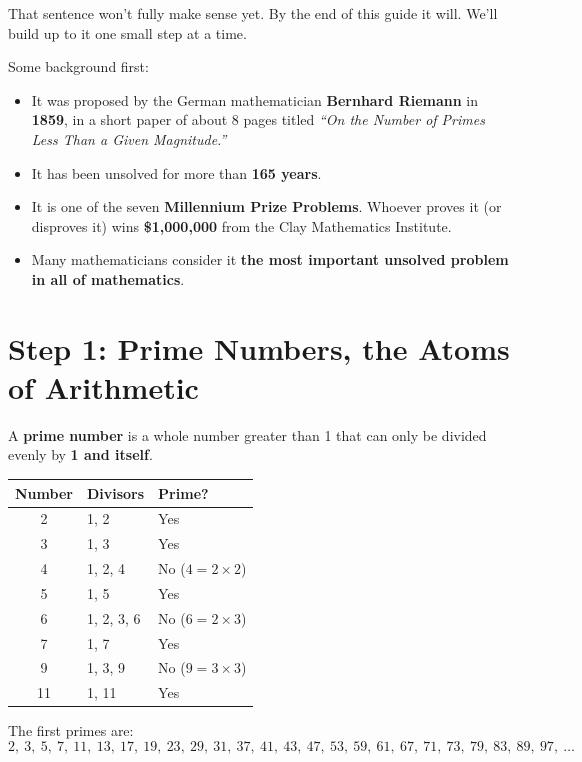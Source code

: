\documentclass[11pt,a4paper]{article}
\begin{document}
That sentence won't fully make sense yet. By the end of this guide it will. We'll build up to it one small step at a time.

Some background first:
\begin{itemize}[itemsep=2pt]
  \item It was proposed by the German mathematician \textbf{Bernhard Riemann} in \textbf{1859}, in a short paper of about 8 pages titled \emph{``On the Number of Primes Less Than a Given Magnitude.''}
  \item It has been unsolved for more than \textbf{165 years}.
  \item It is one of the seven \textbf{Millennium Prize Problems}. Whoever proves it (or disproves it) wins \textbf{\$1{,}000{,}000} from the Clay Mathematics Institute.
  \item Many mathematicians consider it \textbf{the most important unsolved problem in all of mathematics}.
\end{itemize}

\section{Step 1: Prime Numbers, the Atoms of Arithmetic}

A \textbf{prime number} is a whole number greater than 1 that can only be divided evenly by \textbf{1 and itself}.

\begin{center}
\begin{tabular}{c l l}
\toprule
Number & Divisors & Prime? \\
\midrule
2 & 1, 2 & Yes \\
3 & 1, 3 & Yes \\
4 & 1, 2, 4 & No ($4 = 2\times 2$) \\
5 & 1, 5 & Yes \\
6 & 1, 2, 3, 6 & No ($6 = 2\times 3$) \\
7 & 1, 7 & Yes \\
9 & 1, 3, 9 & No ($9 = 3\times 3$) \\
11 & 1, 11 & Yes \\
\bottomrule
\end{tabular}
\end{center}

The first primes are:
\[
2,\ 3,\ 5,\ 7,\ 11,\ 13,\ 17,\ 19,\ 23,\ 29,\ 31,\ 37,\ 41,\ 43,\ 47,\ 53,\ 59,\ 61,\ 67,\ 71,\ 73,\ 79,\ 83,\ 89,\ 97,\ \ldots
\]
\end{document}
